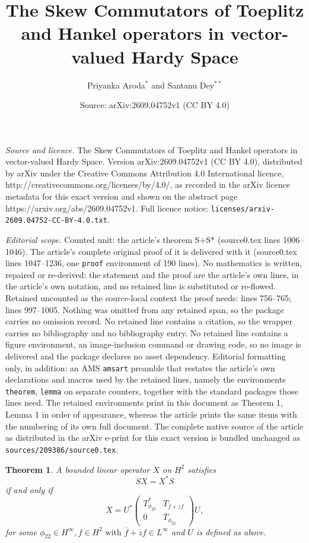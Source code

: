 \documentclass[10pt,a4paper]{amsart}
\title{The Skew Commutators of Toeplitz and Hankel operators in vector-valued Hardy Space}
\author{Priyanka Aroda$^*$ and Santanu Dey$^{**}$}
\date{Source: arXiv:2609.04752v1 (CC BY 4.0)}
\newtheorem{theorem}{Theorem}
\begin{document}
\maketitle

\noindent\emph{Source and licence.} The Skew Commutators of Toeplitz and Hankel operators in vector-valued Hardy Space. Version arXiv:2609.04752v1 (CC BY 4.0), distributed by arXiv under the Creative Commons Attribution 4.0 International licence, http://creativecommons.org/licenses/by/4.0/, as recorded in the arXiv licence metadata for this exact version and shown on the abstract page https://arxiv.org/abs/2609.04752v1. Full licence notice: \texttt{licenses/arxiv-2609.04752-CC-BY-4.0.txt}.\par\smallskip

\noindent\textit{Editorial scope.} Counted unit: the article's theorem S+S* (source0.tex lines 1006--1046). The article's complete original proof of it is delivered with it (source0.tex lines 1047--1236, one \texttt{proof} environment of 190 lines). No mathematics is written, repaired or re-derived: the statement and the proof are the article's own lines, in the article's own notation, and no retained line is substituted or re-flowed.  Retained uncounted as the source-local context the proof needs: lines 756--765; lines 997--1005.  Nothing was omitted from any retained span, so the package carries no omission record.  No retained line contains a citation, so the wrapper carries no bibliography and no bibliography entry.  No retained line contains a figure environment, an image-inclusion command or drawing code, so no image is delivered and the package declares no asset dependency.  Editorial formatting only, in addition: an AMS \texttt{amsart} preamble that restates the article's own declarations and macros used by the retained lines, namely the environments \texttt{theorem}, \texttt{lemma} on separate counters, together with the standard packages those lines need.  The retained environments print in this document as Theorem 1, Lemma 1 in order of appearance, whereas the article prints the same items with the numbering of its own full document.  The complete native source of the article as distributed in the arXiv e-print for this exact version is bundled unchanged as \texttt{sources/209386/source0.tex}.
        \begin{theorem}\label{p-3}
           A bounded linear operator $X$ on $H^2$ satisfies 
           $$SX=X^*S$$
           if and only if 
           $$X=U^*\begin{pmatrix}
                 T^*_{\phi_{22}}&T_{\overline{f}+zf}\\
                 0&T_{\phi_{22}}
             \end{pmatrix}U,$$
           for some $ \phi_{22}\in H^{\infty}, f \in H^2 \text{ with } {\overline{f}+zf} \in L^\infty$ and $U$ is defined as above.
        \end{theorem}
\end{document}
